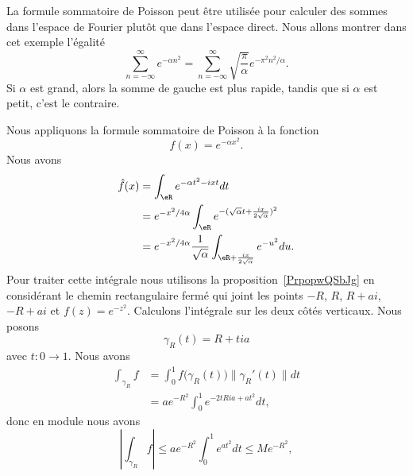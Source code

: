 \begin{example}\label{ExDLjesf}
    La formule sommatoire de Poisson peut être utilisée pour calculer des sommes dans l'espace de Fourier plutôt que dans l'espace direct. Nous allons montrer dans cet exemple l'égalité
    \begin{equation}
        \sum_{n=-\infty}^{\infty} e^{-\alpha n^2}=\sum_{n=-\infty}^{\infty}\sqrt{\frac{ \pi }{ \alpha }} e^{-\pi^2 n^2/\alpha}.
    \end{equation}
    Si \( \alpha\) est grand, alors la somme de gauche est plus rapide, tandis que si \( \alpha\) est petit, c'est le contraire.

    Nous appliquons la formule sommatoire de Poisson à la fonction
    \begin{equation}
        f(x)= e^{-\alpha x^2}.
    \end{equation}
    Nous avons
    \begin{subequations}        \label{EqCDeLht}
        \begin{align}
            \hat f(x)&=\int_{\eR} e^{-\alpha t^2-ixt}dt\\
            &= e^{-x^2/4\alpha}\int_{\eR}e^{ -(\sqrt{\alpha}t+\frac{ ix }{ 2\sqrt{\alpha} })^2 }\\
            &= e^{-x^2/4\alpha}\frac{1}{ \sqrt{\alpha} }\int_{\eR+\frac{ ix }{ 2\sqrt{\alpha} }} e^{-u^2}du.
        \end{align}
    \end{subequations}
    Pour traiter cette intégrale nous utilisons la proposition~\ref{PrpopwQSbJg} en considérant le chemin rectangulaire fermé qui joint les points \( -R\), \( R\), \( R+ai\), \( -R+ai\) et \( f(z)= e^{-z^2}\). Calculons l'intégrale sur les deux côtés verticaux. Nous posons
    \begin{equation}
        \gamma_R(t)=R+tia
    \end{equation}
    avec \( t\colon 0\to 1\). Nous avons
    \begin{subequations}
        \begin{align}
            \int_{\gamma_R}f&=\int_0^1f\big( \gamma_R(t) \big)\| \gamma_R'(t) \|dt\\
            &=a e^{-R^2}\int_0^1 e^{-2tRia+at^2}dt,
        \end{align}
    \end{subequations}
    donc en module nous avons
    \begin{equation}
        | \int_{\gamma_R}f |\leq a e^{-R^2}\int_0^1 e^{at^2}dt\leq M e^{-R^2},

\end{equation}
\end{example}
